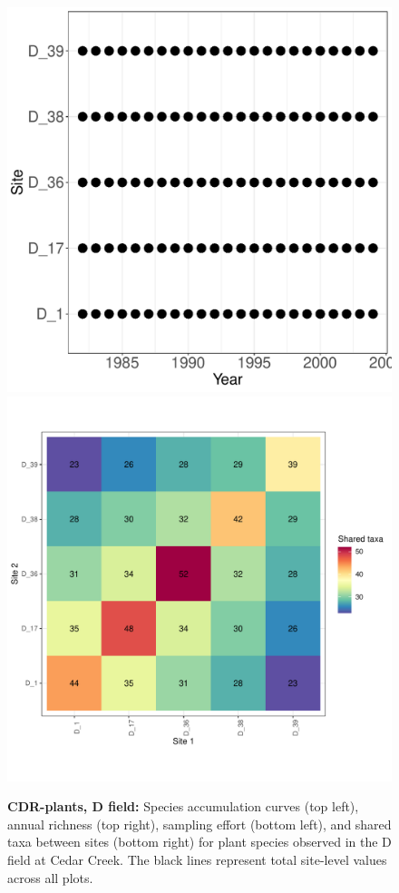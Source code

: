 \documentclass[11pt, oneside]{article}
\begin{document}
\begin{figure}[h!]
\includegraphics[scale = 0.4]{cdr-plantsD-compagnoni_spatiotemporal_sampling_effort.pdf}
\includegraphics[scale = 0.4]{cdr-plantsD-compagnoni_spp_shared.pdf}
\caption{{\bf CDR-plants, D field:} Species accumulation curves (top left),  annual richness (top right), sampling effort (bottom left), and shared taxa between sites (bottom right) for plant species observed in the D field at Cedar Creek. The black lines represent total site-level values across all plots.}
\label{cdrD-plants}
\end{figure}
\end{document}
